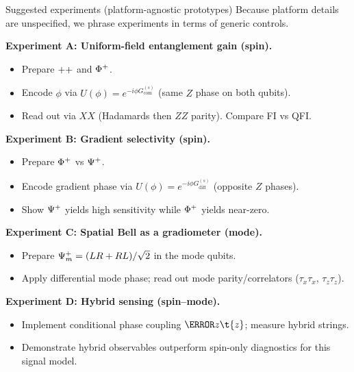 \documentclass[aspectratio=169]{beamer}
\newcommand{\GcomS}{G_{\mathrm{com}}^{(s)}}
\newcommand{\GdiffS}{G_{\mathrm{diff}}^{(s)}}
\begin{document}
\begin{frame}{Suggested experiments (platform-agnostic prototypes)}
\small
Because platform details are unspecified, we phrase experiments in terms of generic controls.

\vspace{0.25em}
\textbf{Experiment A: Uniform-field entanglement gain (spin).}
\begin{itemize}
\item Prepare $\relax{+}\relax{+}$ and $\relax{\Phi^+}$.
\item Encode $\phi$ via $U(\phi)=e^{-i\phi \GcomS}$ (same $Z$ phase on both qubits).
\item Read out via $XX$ (Hadamards then $ZZ$ parity). Compare FI vs QFI.
\end{itemize}

\vspace{0.25em}
\textbf{Experiment B: Gradient selectivity (spin).}
\begin{itemize}
\item Prepare $\relax{\Phi^+}$ vs $\relax{\Psi^+}$.
\item Encode gradient phase via $U(\phi)=e^{-i\phi \GdiffS}$ (opposite $Z$ phases).
\item Show $\relax{\Psi^+}$ yields high sensitivity while $\relax{\Phi^+}$ yields near-zero.
\end{itemize}

\vspace{0.25em}
\textbf{Experiment C: Spatial Bell as a gradiometer (mode).}
\begin{itemize}
\item Prepare $\relax{\Psi_m^+}=(\relax{LR}+\relax{RL})/\sqrt2$ in the mode qubits.
\item Apply differential mode phase; read out mode parity/correlators ($\tau_x\tau_x$, $\tau_z\tau_z$).
\end{itemize}

\vspace{0.25em}
\textbf{Experiment D: Hybrid sensing (spin--mode).}
\begin{itemize}
\item Implement conditional phase coupling $\s{z}\t{z}$; measure hybrid strings.
\item Demonstrate hybrid observables outperform spin-only diagnostics for this signal model.
\end{itemize}
\end{frame}
\end{document}
